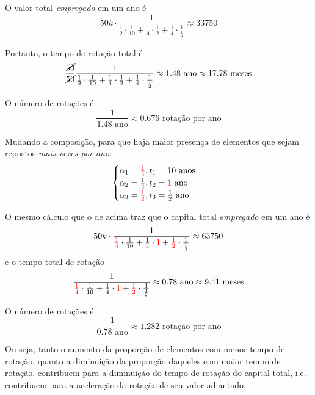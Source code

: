 O valor total \textit{empregado} em um ano é
$$
50k \cdot \frac{1}{\frac{1}{2}\cdot \frac{1}{10} + \frac{1}{4} \cdot \frac{1}{2} + \frac{1}{4} \cdot \frac{1}{\frac{1}{2}}} \approx 33750
$$

Portanto, o tempo de rotação total é
$$
\frac{\cancel{ 50 }}{\cancel{ 50 }} \frac{1}{\frac{1}{2}\cdot \frac{1}{10} + \frac{1}{4} \cdot \frac{1}{2} + \frac{1}{4} \cdot \frac{1}{\frac{1}{2}}} \approx 1.48 \text{ ano} \approx 17.78 \text{ meses}
$$

O número de rotações é
$$
\frac{1}{1.48 \text{ ano}} \approx 0.676 \text{ rotação por ano}
$$

Mudando a composição, para que haja maior presença de elementos que sejam repostos \textit{mais vezes por ano}:
$$
\begin{cases}
\alpha_{1}={\color{red} \frac{1}{4}}, t_{1}=10 \text{ anos} \\
\alpha_{2}=\frac{1}{4}, t_{2}={\color{red} 1} \text{ ano}\\
\alpha_{3}={\color{red} \frac{1}{2}}, t_{3}=\frac{1}{2} \text{ ano}
\end{cases}
$$

O mesmo cálculo que o de acima traz que o capital total \textit{empregado} em um ano é
$$
50k \cdot \frac{1}{{\color{red} \frac{1}{4}}\cdot \frac{1}{10} + \frac{1}{4} \cdot {\color{red} 1} + {\color{red} \frac{1}{2}} \cdot \frac{1}{\frac{1}{2}}} \approx 63750
$$
e o tempo total de rotação
$$
\frac{1}{{\color{red} \frac{1}{4}}\cdot \frac{1}{10} + \frac{1}{4} \cdot {\color{red} 1} + {\color{red} \frac{1}{2}} \cdot \frac{1}{\frac{1}{2}}} \approx 0.78 \text{ ano} \approx 9.41 \text{ meses}
$$

O número de rotações é 
$$
\frac{1}{0.78 \text{ ano}} \approx 1.282 \text{ rotação por ano}
$$

Ou seja, tanto o aumento da proporção de elementos com menor tempo de rotação, quanto a diminuição da proporção daqueles com maior tempo de rotação, contribuem para a diminuição do tempo de rotação do capital total, i.e. contribuem para a aceleração da rotação de seu valor adiantado. 

